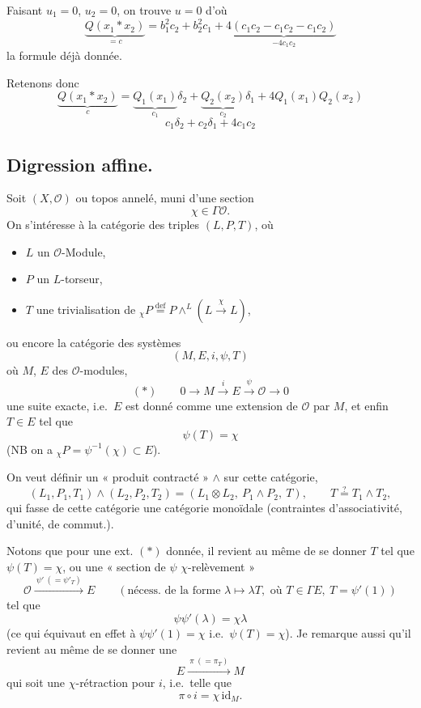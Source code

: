 \documentclass[11pt,a4paper]{article}
\begin{document}
Faisant $u_1 = 0$, $u_2 = 0$, on trouve $u = 0$ d'où
\[
  \underbrace{Q(x_1 * x_2)}_{= c} = b_1^2 c_2 + b_2^2 c_1
  + 4\underbrace{(c_1c_2 - c_1c_2 - c_1c_2)}_{-4c_1c_2}
\]
la formule déjà donnée.

Retenons donc
\[
  \boxed{\underbrace{Q(x_1 * x_2)}_{c} = \underbrace{Q_1(x_1)}_{c_1}\delta_2
  + \underbrace{Q_2(x_2)}_{c_2}\delta_1 + 4Q_1(x_1)Q_2(x_2)}
\]
\[
  c_1\delta_2 + c_2\delta_1 + 4c_1c_2
\]

\subsection{Digression affine.}

Soit $(X, \mathcal{O})$  ou topos annelé, muni d'une section
\[
  \chi \in \Gamma\mathcal{O}.
\]
On s'intéresse à la catégorie des triples $(L, P, T)$, où
\begin{itemize}
  \item $L$ un $\mathcal{O}$-Module,
  \item $P$ un $L$-torseur,
  \item $T$ une trivialisation de ${}_{\chi}P \overset{\mathrm{def}}{=} P \wedge^{L} (L \xrightarrow{\chi} L)$,
\end{itemize}
ou encore la catégorie des  systèmes
\[
  (M, E, i, \psi, T)
\]
où $M$, $E$ des $\mathcal{O}$-modules,
\[
  (*) \qquad 0 \to M \xrightarrow{i} E \xrightarrow{\psi} \mathcal{O} \to 0
\]
une suite exacte, i.e.\ $E$ est donné comme une extension de $\mathcal{O}$ par $M$, et enfin $T \in E$ tel que
\[
  \psi(T) = \chi
\]
(NB on a ${}_{\chi}P = \psi^{-1}(\chi) \subset E$).


On veut définir un « produit contracté » $\wedge$ sur cette catégorie,
\[
  (L_1, P_1, T_1) \wedge (L_2, P_2, T_2) = (L_1 \otimes L_2,\ P_1 \wedge P_2,\ T),
  \qquad T \overset{?}{=} T_1 \wedge T_2,
\]
qui fasse de cette catégorie une catégorie monoïdale (contraintes d'associativité, d'unité, de commut.).

Notons que pour une ext. $(*)$ donnée, il revient au même de se donner $T$ tel que $\psi(T) = \chi$, ou une « section de $\psi$ $\chi$-relèvement »
\[
  \mathcal{O} \xrightarrow{\ \psi' \ (= \psi'_T)\ } E
  \qquad (\text{nécess.\ de la forme } \lambda \mapsto \lambda T, \text{ où } T \in \Gamma E,\ T = \psi'(1))
\]
tel que
\[
  \psi\psi'(\lambda) = \chi\lambda
\]
(ce qui équivaut en effet à $\psi\psi'(1) = \chi$ i.e.\ $\psi(T) = \chi$).
Je remarque aussi qu'il revient au même de se donner une 
\[
  E \xrightarrow{\ \pi\ (= \pi_T)\ } M
\]
qui soit une $\chi$-rétraction pour $i$, i.e.\ telle que
\[
  \pi \circ i = \chi\, \mathrm{id}_M .
\]
\end{document}
